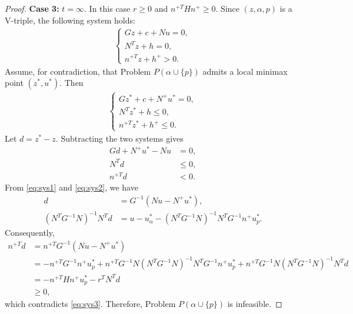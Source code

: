 \documentclass[10pt,a4paper]{amsart}
\begin{document}
\begin{proof}
		\noindent\textbf{Case 3:} $t = \infty$.  
		In this case $r \ge 0$ and $n^{+T}Hn^{+} \ge 0$.  
		Since $(z, \alpha, p)$ is a V-triple, the following system holds:
		\begin{align*}
		\begin{cases}
			Gz + c + N u = 0,\\
			N^{T}z + h = 0,\\
			n^{+T}z + h^{+} > 0.
		\end{cases}
		\end{align*}
		Assume, for contradiction, that Problem $P(\alpha \cup \{p\})$ admits a local minimax point $(z^{\ast}, u^{\ast})$.  
		Then
		\begin{align*}
		\begin{cases}
			Gz^{\ast} + c + N^{+}u^{\ast} = 0,\\
			N^{T}z^{\ast} + h \le 0,\\
			n^{+T}z^{\ast} + h^{+} \le 0.
		\end{cases}
		\end{align*}
		Let $d = z^{\ast} - z$.  
		Subtracting the two systems gives
		\begin{align}
			Gd + N^{+}u^{\ast} - N u &= 0, \label{eq:sys1}\\
			N^{T}d &\le 0, \label{eq:sys2}\\
			n^{+T}d &< 0. \label{eq:sys3}
		\end{align}
		From \eqref{eq:sys1} and \eqref{eq:sys2}, we have
		\begin{align*}
			d &= G^{-1}(N u - N^{+}u^{\ast}),\\
			(N^{T}G^{-1}N)^{-1}N^{T}d
			&= u - u_{\alpha}^{\ast} - (N^{T}G^{-1}N)^{-1}N^{T}G^{-1}n^{+}u_{p}^{\ast}.
		\end{align*}
		Consequently,
		\begin{align*}
			n^{+T}d
			&= n^{+T}G^{-1}(N u - N^{+}u^{\ast})\\
			&= -n^{+T}G^{-1}n^{+}u_{p}^{\ast}
			+ n^{+T}G^{-1}N(N^{T}G^{-1}N)^{-1}N^{T}G^{-1}n^{+}u_{p}^{\ast}
			+ n^{+T}G^{-1}N(N^{T}G^{-1}N)^{-1}N^{T}d\\
			&= -n^{+T}Hn^{+}u_{p}^{\ast} - r^{T}N^{T}d\\
			&\geq 0,
		\end{align*}
		which contradicts \eqref{eq:sys3}.  
		Therefore, Problem $P(\alpha \cup \{p\})$ is infeasible.
	\end{proof}
\end{document}
